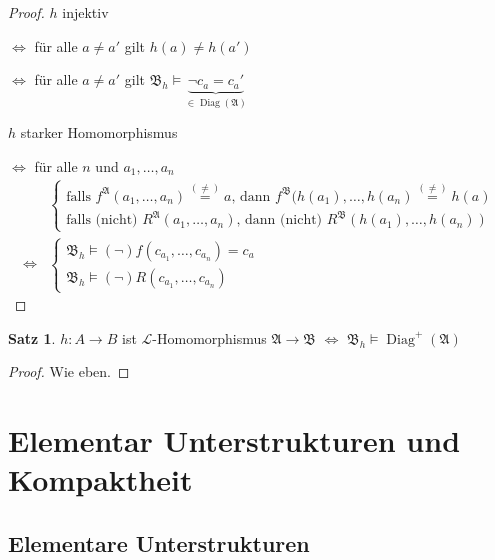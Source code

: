 \documentclass[12pt,parskip=full]{scrartcl}
\theoremstyle{definition}
\newtheorem{theorem}{Satz}[section]
\begin{document}
	\begin{proof}
		$h$ injektiv 
		
		$\Leftrightarrow$ für alle $a \neq a'$ gilt $h(a) \neq h(a')$ 
		
		$\Leftrightarrow$ für alle $a \neq a'$ gilt $\mathfrak{B}_h \models \underbrace{\lnot c_a = c_a'}_{\in \operatorname{Diag}(\mathfrak{A})}$
		
		$h$ starker Homomorphismus
		
		$\Leftrightarrow$ für alle $n$ und $a_1, \dots, a_n$
		\begin{align*}
			&\begin{cases}
				\text{falls $f^\mathfrak{A}(a_1, \dots, a_n) \overset{(\neq)}{=} a$, dann $f^\mathfrak{B}(h(a_1), \dots, h(a_n) \overset{(\neq)}{=} h(a)$} \\
				\text{falls (nicht) $R^\mathfrak{A}(a_1, \dots, a_n)$, dann (nicht) $R^\mathfrak{B}(h(a_1), \dots, h(a_n))$}
			\end{cases} \\
			\Leftrightarrow&\begin{cases}
				\mathfrak{B}_h \models (\lnot) f(c_{a_1}, \dots, c_{a_n}) = c_a \\
				\mathfrak{B}_h \models (\lnot) R(c_{a_1}, \dots, c_{a_n})
			\end{cases}
		\end{align*}
	\end{proof}

	\begin{theorem}
		$h: A \to B$ ist $\mathcal{L}$-Homomorphismus $\mathfrak{A} \to \mathfrak{B}$ $\Leftrightarrow$ $\mathfrak{B}_h \models \operatorname{Diag}^+(\mathfrak{A})$
	\end{theorem}

	\begin{proof}
		Wie eben.
	\end{proof}

	\section{Elementar Unterstrukturen und Kompaktheit}
	
	\subsection{Elementare Unterstrukturen}
	
\end{document}
